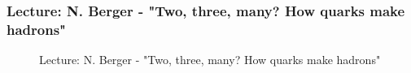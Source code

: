 \documentclass[11pt,a4paper]{article}
\numberwithin{equation}{section}
\numberwithin{table}{section}\setlength{\multlinegap}{25pt}
\begin{document}
\subsubsection{Lecture: N. Berger - "Two, three, many? How quarks make hadrons"}

\begin{figure}[H]
\centering
\null\hfill %
\hfill %
\hfill %
\hfill %
\hfill\null %
\caption{Lecture: N. Berger - "Two, three, many? How quarks make hadrons"}
\end{figure} 
\end{document}
